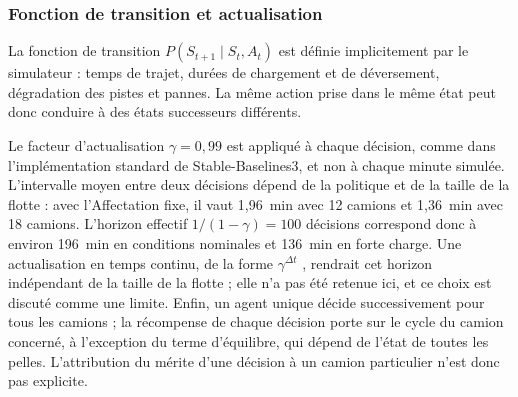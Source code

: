\documentclass[11pt,a4paper]{article}
\newif\ifrevmarks
\newcommand{\revtag}[1]{\ifrevmarks\textsuperscript{\textcolor{red!70!black}{\scriptsize[#1]}}\fi}
\newenvironment{revbloc}[1]{\par\ifrevmarks\color{revcolor}\noindent\revtag{#1}\ \fi}{\par}
\begin{document}
\subsubsection{Fonction de transition et actualisation}

La fonction de transition $P(S_{t+1} \mid S_t, A_t)$ est définie implicitement par le simulateur : temps de trajet, durées de chargement et de déversement, dégradation des pistes et pannes. La même action prise dans le même état peut donc conduire à des états successeurs différents.

\begin{revbloc}{M9}
Le facteur d'actualisation $\gamma = 0{,}99$ est appliqué à chaque décision, comme dans l'implémentation standard de Stable-Baselines3, et non à chaque minute simulée. L'intervalle moyen entre deux décisions dépend de la politique et de la taille de la flotte : avec l'Affectation fixe, il vaut 1,96~min avec 12 camions et 1,36~min avec 18 camions. L'horizon effectif $1/(1-\gamma) = 100$ décisions correspond donc à environ 196~min en conditions nominales et 136~min en forte charge. Une actualisation en temps continu, de la forme $\gamma^{\Delta t}$ \cite{BradtkeDuff1995, SuttonPrecupSingh1999}, rendrait cet horizon indépendant de la taille de la flotte ; elle n'a pas été retenue ici, et ce choix est discuté comme une limite. Enfin, un agent unique décide successivement pour tous les camions ; la récompense de chaque décision porte sur le cycle du camion concerné, à l'exception du terme d'équilibre, qui dépend de l'état de toutes les pelles. L'attribution du mérite d'une décision à un camion particulier n'est donc pas explicite.
\end{revbloc}
\end{document}
